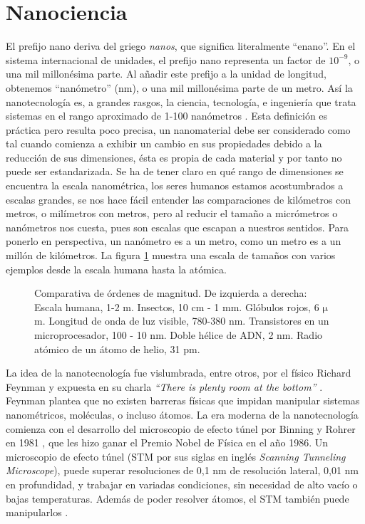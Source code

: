 \section{Nanociencia}
El prefijo nano deriva del griego \emph{nanos}, que significa literalmente ``enano''. En el sistema internacional de unidades, el prefijo nano representa un factor de $\mathrm{10^{-9}}$, o una mil millonésima parte. Al añadir este prefijo a la unidad de longitud, obtenemos ``nanómetro'' (nm), o una mil millonésima parte de un metro. Así la nanotecnología es, a grandes rasgos, la ciencia, tecnología, e ingeniería que trata sistemas en el rango aproximado de 1-100 nanómetros \citep{Haick2013,Gressler2013}. Esta definición es práctica pero resulta poco precisa, un nanomaterial debe ser considerado como tal cuando comienza a exhibir un cambio en sus propiedades debido a la reducción de sus dimensiones, ésta es propia de cada material y por tanto no puede ser estandarizada. Se ha de tener claro en qué rango de dimensiones se encuentra la escala nanométrica, los seres humanos estamos acostumbrados a escalas grandes, se nos hace fácil entender las comparaciones de kilómetros con metros, o milímetros con metros, pero al reducir el tamaño a micrómetros o nanómetros nos cuesta, pues son escalas que escapan a nuestros sentidos. Para ponerlo en perspectiva, un nanómetro es a un metro, como un metro es a un millón de kilómetros. La figura \ref{fig:scale} muestra una escala de tamaños con varios ejemplos desde la escala humana hasta la atómica.

\begin{figure}[h!]
	\centering
	\caption[Comparativa de ódenes de magnitud desde metros hasta picometros]{Comparativa de órdenes de magnitud. De izquierda a derecha: Escala humana, 1-2 m. Insectos, 10 cm - 1 mm. Glóbulos rojos, 6 $\mathrm{\mu}$m. Longitud de onda de luz visible, 780-380 nm. Transistores en un microprocesador, 100 - 10 nm. Doble hélice de ADN, 2 nm. Radio atómico de un átomo de helio, 31 pm.}
\label{fig:scale}
\end{figure}

La idea de la nanotecnología fue vislumbrada, entre otros, por el físico Richard Feynman y expuesta en su charla \emph{``There is plenty room at the bottom''} \citep{Feynman1960}. Feynman plantea que no existen barreras físicas que impidan manipular sistemas nanométricos, moléculas, o incluso átomos. La era moderna de la nanotecnología comienza con el desarrollo del microscopio de efecto túnel por Binning y Rohrer en 1981 \citep{Binnig1982}, que les hizo ganar el Premio Nobel de Física en el año 1986. Un microscopio de efecto túnel (STM por sus siglas en inglés \emph{Scanning Tunneling Microscope}), puede superar resoluciones de 0,1 nm de resolución lateral, 0,01 nm en profundidad, y trabajar en variadas condiciones, sin necesidad de alto vacío o bajas temperaturas. Además de poder resolver átomos, el STM también puede manipularlos \citep{Chen2008}.

